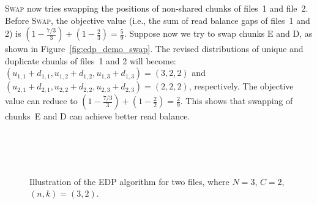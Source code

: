 \textsc{Swap} now tries swapping the positions of non-shared chunks of 
files~1 and file~2.  Before \textsc{Swap}, the objective value (i.e., the sum
of read balance gaps of files~1 and 2) is 
$(1 - \frac{7/3}{3}) + (1 - \frac{2}{3})= \frac{5}{9}$. 
Suppose now we try to swap chunks E and D, as shown in
Figure~\ref{fig:edp_demo_swap}.  The revised distributions of unique and
duplicate chunks of files~1 and 2 will become:
$(u_{1,1}+d_{1,1},u_{1,2}+d_{1,2},u_{1,3}+d_{1,3}) = (3,2,2)$ and
$(u_{2,1}+d_{2,1},u_{2,2}+d_{2,2},u_{2,3}+d_{2,3}) = (2,2,2)$, respectively.
The objective value can reduce to 
$(1 - \frac{7/3}{3}) + (1 - \frac{2}{2}) = \frac{2}{9}$.  This shows that
swapping of chunks~E and D can achieve better read balance. 

\begin{figure}[H]
\centering
\vspace{-10pt}
\\
\hspace{4pt}
\\
\subfigure[ Greedy placement of File 2. $(u_{2,1}, u_{2,2}, u_{2,3})=(2,0,0)$. ]{
\texttt{[image: edp\_demo\_file1.eps]}
\label{fig:edp_demo_file1}
}
\\
\hspace{4pt}
\caption{\Large Illustration of the EDP algorithm for two files, where $N = 3$, 
	$C = 2$, $(n,k) = (3,2)$. }
\label{fig:edp_demo}
\vspace{-6pt}
\end{figure}




